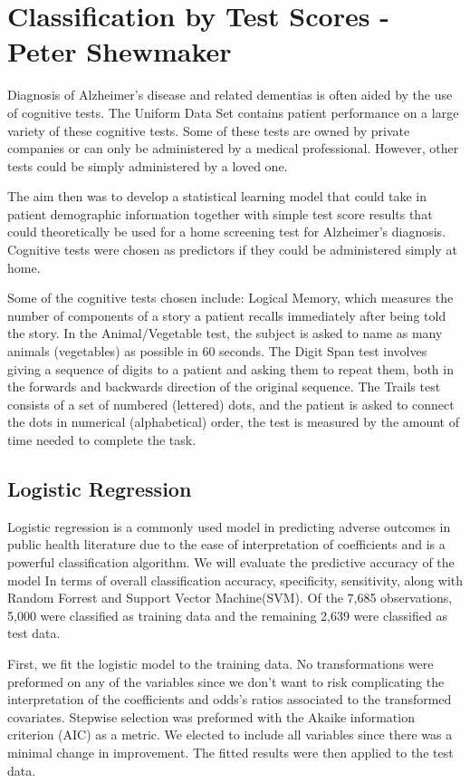 \documentclass[a4paper,man,natbib,11pt]{article}
\begin{document}
\section{Classification by Test Scores - Peter Shewmaker}

Diagnosis of Alzheimer's disease and related dementias is often aided by the use of cognitive tests. The Uniform Data Set contains patient performance on a large variety of these cognitive tests. Some of these tests are owned by private companies or can only be administered by a medical professional. However, other tests could be simply administered by a loved one. 

The aim then was to develop a statistical learning model that could take in patient demographic information together with simple test score results that could theoretically be used for a home screening test for Alzheimer's diagnosis. Cognitive tests were chosen as predictors if they could be administered simply at home. 

Some of the cognitive tests chosen include: Logical Memory, which measures the number of components of a story a patient recalls immediately after being told the story. In the Animal/Vegetable test, the subject is asked to name as many animals (vegetables) as possible in 60 seconds. The Digit Span test involves giving a sequence of digits to a patient and asking them to repeat them, both in the forwards and backwards direction of the original sequence. The Trails test consists of a set of numbered (lettered) dots, and the patient is asked to connect the dots in numerical (alphabetical) order, the test is measured by the amount of time needed to complete the task.

\subsection{Logistic Regression}
Logistic regression is a commonly used model in predicting adverse outcomes in public health literature due to the ease of interpretation of coefficients and is a powerful classification algorithm. We will evaluate the predictive accuracy of the model In terms of overall classification accuracy, specificity, sensitivity, along with Random Forrest and Support Vector Machine(SVM). Of the 7,685 observations,  5,000 were classified as training data and the remaining 2,639 were classified as test data. 

First, we fit the logistic model to the training data. No transformations were preformed on any of the variables since we don't want to risk complicating the interpretation of the coefficients and odds's ratios associated to the transformed covariates. Stepwise selection was preformed with the Akaike information criterion (AIC) as a metric. We elected to include all variables since there was a minimal change in improvement. The fitted results were then applied to the test data. 
\end{document}
